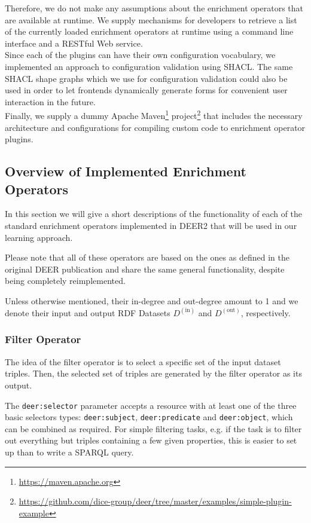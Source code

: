 Therefore, we do not make any assumptions about the enrichment operators that are available at runtime.
We supply mechanisms for developers to retrieve a list of the currently loaded enrichment operators at runtime using a command line interface and a RESTful Web service.\\

Since each of the plugins can have their own configuration vocabulary, we implemented an approach to configuration validation using \ac{SHACL}.
The same \ac{SHACL} shape graphs which we use for configuration validation could also be used in order to let frontends dynamically generate forms for convenient user interaction in the future.\\

Finally, we supply a dummy Apache Maven\footnote{\url{https://maven.apache.org}} project\footnote{\url{https://github.com/dice-group/deer/tree/master/examples/simple-plugin-example}} that includes the necessary architecture and configurations for compiling custom code to enrichment operator plugins.

\subsection{Overview of Implemented Enrichment Operators}
\label{ssec:ops}
In this section we will give a short descriptions of the functionality of each of the standard enrichment operators implemented in \ac{DEER2} that will be used in our learning approach.

Please note that all of these operators are based on the ones as defined in the original \ac{DEER} publication\cite{sherif:2015a} and share the same general functionality, despite being completely reimplemented.

Unless otherwise mentioned, their in-degree and out-degree amount to 1 and we denote their input and output \ac{RDF} Datasets $D^{(\text{in})}$ and $D^{(\text{out})}$, respectively.

\subsubsection*{Filter Operator}

The idea of the filter operator is to select a specific set of the input dataset triples.
Then, the selected set of triples are generated by the filter operator as its output.

The \texttt{deer:selector} parameter accepts a resource with at least one of the three basic selectors types: \texttt{deer:subject}, \texttt{deer:predicate} and \texttt{deer:object}, which can be combined as required.
For simple filtering tasks, e.g. if the task is to filter out everything but triples containing a few given properties, this is easier to set up than to write a \ac{SPARQL} query.

